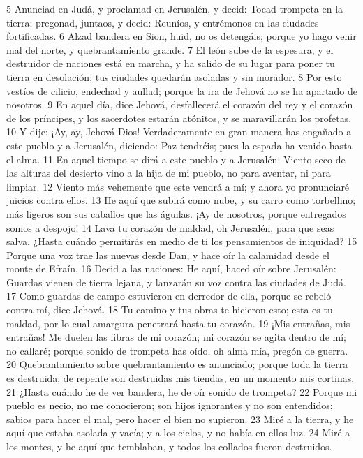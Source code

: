 5 Anunciad en Judá, y proclamad en Jerusalén, y decid: Tocad trompeta en la tierra; pregonad, juntaos, y decid: Reuníos, y entrémonos en las ciudades fortificadas.
6 Alzad bandera en Sion, huid, no os detengáis; porque yo hago venir mal del norte, y quebrantamiento grande.
7 El león sube de la espesura, y el destruidor de naciones está en marcha, y ha salido de su lugar para poner tu tierra en desolación; tus ciudades quedarán asoladas y sin morador.
8 Por esto vestíos de cilicio, endechad y aullad; porque la ira de Jehová no se ha apartado de nosotros.
9 En aquel día, dice Jehová, desfallecerá el corazón del rey y el corazón de los príncipes, y los sacerdotes estarán atónitos, y se maravillarán los profetas.
10 Y dije: ¡Ay, ay, Jehová Dios! Verdaderamente en gran manera has engañado a este pueblo y a Jerusalén, diciendo: Paz tendréis; pues la espada ha venido hasta el alma.
11 En aquel tiempo se dirá a este pueblo y a Jerusalén: Viento seco de las alturas del desierto vino a la hija de mi pueblo, no para aventar, ni para limpiar.
12 Viento más vehemente que este vendrá a mí; y ahora yo pronunciaré juicios contra ellos.
13 He aquí que subirá como nube, y su carro como torbellino; más ligeros son sus caballos que las águilas. ¡Ay de nosotros, porque entregados somos a despojo!
14 Lava tu corazón de maldad, oh Jerusalén, para que seas salva. ¿Hasta cuándo permitirás en medio de ti los pensamientos de iniquidad?
15 Porque una voz trae las nuevas desde Dan, y hace oír la calamidad desde el monte de Efraín.
16 Decid a las naciones: He aquí, haced oír sobre Jerusalén: Guardas vienen de tierra lejana, y lanzarán su voz contra las ciudades de Judá.
17 Como guardas de campo estuvieron en derredor de ella, porque se rebeló contra mí, dice Jehová.
18 Tu camino y tus obras te hicieron esto; esta es tu maldad, por lo cual amargura penetrará hasta tu corazón.
19 ¡Mis entrañas, mis entrañas! Me duelen las fibras de mi corazón; mi corazón se agita dentro de mí; no callaré; porque sonido de trompeta has oído, oh alma mía, pregón de guerra.
20 Quebrantamiento sobre quebrantamiento es anunciado; porque toda la tierra es destruida; de repente son destruidas mis tiendas, en un momento mis cortinas.
21 ¿Hasta cuándo he de ver bandera, he de oír sonido de trompeta?
22 Porque mi pueblo es necio, no me conocieron; son hijos ignorantes y no son entendidos; sabios para hacer el mal, pero hacer el bien no supieron.
23 Miré a la tierra, y he aquí que estaba asolada y vacía; y a los cielos, y no había en ellos luz.
24 Miré a los montes, y he aquí que temblaban, y todos los collados fueron destruidos.
